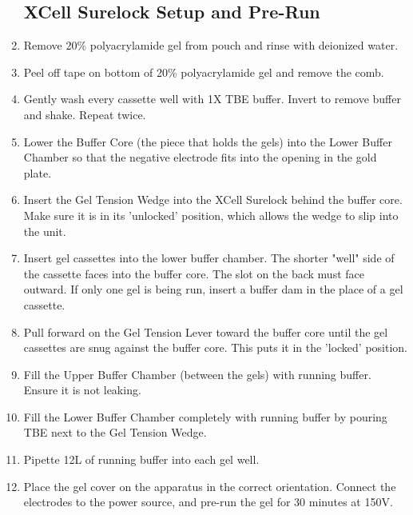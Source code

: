 \documentclass[letterpaper]{article}
\newcommand{\uL}{\micro{}L}
\begin{document}
\begin{enumerate}
\subsection{XCell Surelock Setup and Pre-Run}
\item{Remove 20\% polyacrylamide gel from pouch and rinse with deionized water.}
\item{Peel off tape on bottom of 20\% polyacrylamide gel and remove the comb.}
\item{Gently wash every cassette well with 1X TBE buffer. Invert to remove buffer and shake. Repeat twice.}
\item{Lower the Buffer Core (the piece that holds the gels) into the Lower Buffer Chamber so that the negative electrode fits into the opening in the gold plate.}
\item{Insert the Gel Tension Wedge into the XCell Surelock behind the buffer core. Make sure it is in its 'unlocked' position, which allows the wedge to slip into the unit.}
\item{Insert gel cassettes into the lower buffer chamber. The shorter "well" side of the cassette faces into the buffer core. The slot on the back must face outward. If only one gel is being run, insert a buffer dam in the place of a gel cassette.}
\item{Pull forward on the Gel Tension Lever toward the buffer core until the gel cassettes are snug against the buffer core. This puts it in the 'locked' position.}
\item{Fill the Upper Buffer Chamber (between the gels) with running buffer. Ensure it is not leaking.}
\item{Fill the Lower Buffer Chamber completely with running buffer by pouring TBE next to the Gel Tension Wedge.}
\item{Pipette 12\uL{} of running buffer into each gel well.}
\item{Place the gel cover on the apparatus in the correct orientation. Connect the electrodes to the power source, and pre-run the gel for 30 minutes at 150V.}


\end{enumerate}
\end{document}

